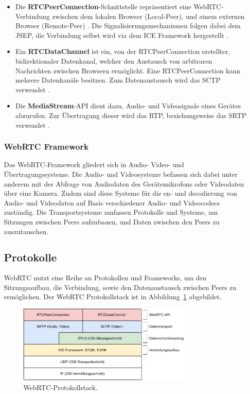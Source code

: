 \begin{itemize}
  \item Die \textbf{RTCPeerConnection}-Schnittstelle repräsentiert eine WebRTC-Verbindung zwischen dem lokalen Browser (Local-Peer), und einem externen Browser (Remote-Peer) \cite{rtcpeerconnection}. Die Signalisierungsmechanismen folgen dabei dem \ac{JSEP}, die Verbindung selbst wird via dem \ac{ICE} Framework hergestellt \cite{loreto2014}.
  
  \item Ein \textbf{RTCDataChannel} ist ein, von der RTCPeerConnection erstellter, bidirektionaler Datenkanal, welcher den Austausch von arbitraren Nachrichten zwischen Browsern ermöglicht. Eine RTCPeerConnection kann mehrere Datenkanäle besitzen. Zum Datenaustausch wird das \ac{SCTP} verwendet \cite{loreto2014, rtcpeerconnection}.
  
  \item Die \textbf{MediaStream}-\acs{API} dient dazu, Audio- und Videosignale eines Gerätes abzurufen. Zur Übertragung dieser wird das \ac{RTP}, beziehungsweise das \ac{SRTP} verwendet \cite{loreto2014}.
\end{itemize}

\subsubsection*{WebRTC Framework}
Das \acs{WebRTC}-Framework gliedert sich in Audio- Video- und Übertragungssysteme. Die Audio- und Videosysteme befassen sich dabei unter anderem mit der Abfrage von Audiodaten des Gerätemikrofons oder Videodaten über eine Kamera. Zudem sind diese Systeme für die en- und decodierung von Audio- und Videodaten auf Basis verschiedener Audio- und Videocodecs zuständig. Die Transportsysteme umfassen Protokolle und Systeme, um Sitzungen zwischen Peers aufzubauen, und Daten zwischen den Peers zu auszutauschen.

\subsection{Protokolle}
WebRTC nutzt eine Reihe an Protokollen und Frameworks, um den Sitzungsaufbau, die Verbindung, sowie den Datenaustausch zwischen Peers zu ermöglichen. Der WebRTC Protokollstack ist in Abbildung~\ref{fig:protocols} abgebildet.

\begin{figure}[h]
\centering
\includegraphics[width=0.78\textwidth]{bilder/PDF_SVG/PROTOCOL_STACK.pdf}
\caption{\acs{WebRTC}-Protokollstack.}
\label{fig:protocols}
\end{figure}

